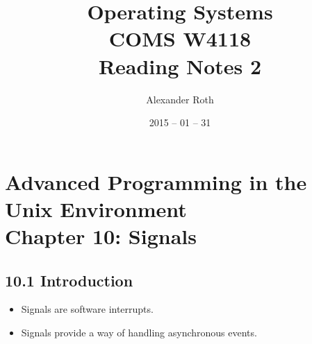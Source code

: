 \documentclass[]{article} \usepackage[all]{xy}
\begin{document}
\newtheorem{thm}{Theorem}
\title{Operating Systems \\ COMS W4118 \\ Reading Notes 2}
\author{Alexander Roth}
\date{2015 -- 01 -- 31}
\maketitle

\section*{Advanced Programming in the Unix Environment \\
Chapter 10: Signals}
\subsection*{10.1 Introduction}
\begin{itemize}
\item Signals are software interrupts.
\item Signals provide a way of handling asynchronous events.
\end{itemize}
\end{document}
